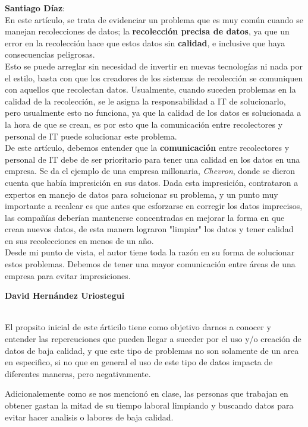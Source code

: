 \documentclass{article}
\begin{document}
\textbf{Santiago Díaz}:\\
En este artículo, se trata de evidenciar un problema que es muy común cuando se manejan recolecciones de datos; la \textbf{recolección precisa de datos}, ya que un error en la recolección hace que estos datos sin \textbf{calidad}, e inclusive que haya consecuencias peligrosas.\\
Esto se puede arreglar sin necesidad de invertir en nuevas tecnologías ni nada por el estilo, basta con que los creadores de los sistemas de recolección se comuniquen con aquellos que recolectan datos. Usualmente, cuando suceden problemas en la calidad de la recolección, se le asigna la responsabilidad a IT de solucionarlo, pero usualmente esto no funciona, ya que la calidad de los datos es solucionada a la hora de que se crean, es por esto que la comunicación entre recolectores y personal de IT puede solucionar este problema.\\
De este artículo, debemos entender que la \textbf{comunicación} entre recolectores y personal de IT debe de ser prioritario para tener una calidad en los datos en una empresa. Se da el ejemplo de una empresa millonaria, \textit{Chevron}, donde se dieron cuenta que había impresición en sus datos. Dada esta impresición, contrataron a expertos en manejo de datos para solucionar su problema, y un punto muy importante a recalcar es que antes que esforzarse en corregir los datos imprecisos, las compañías deberían mantenerse concentradas en mejorar la forma en que crean nuevos datos, de esta manera lograron "limpiar" los datos y tener calidad en sus recolecciones en menos de un año.\\
Desde mi punto de vista, el autor tiene toda la razón en su forma de solucionar estos problemas. Debemos de tener una mayor comunicación entre áreas de una empresa para evitar impresiciones.
\\

\begin{center}
\textbf{David Hernández Uriostegui}
\end{center}
\\

El propsito inicial de este árticilo tiene como objetivo darnos a conocer y entender las repercuciones que pueden llegar a suceder por el uso y/o creación de datos de baja calidad, y que este tipo de problemas no son solamente de un area en especifico, si no que en general el uso de este tipo  de datos impacta de diferentes maneras, pero negativamente.

Adicionalemente como se nos mencionó en clase, las personas que trabajan en obtener gastan la mitad de su tiempo laboral limpiando y buscando datos para evitar hacer analisis o labores de baja calidad.
\\
\end{document}
